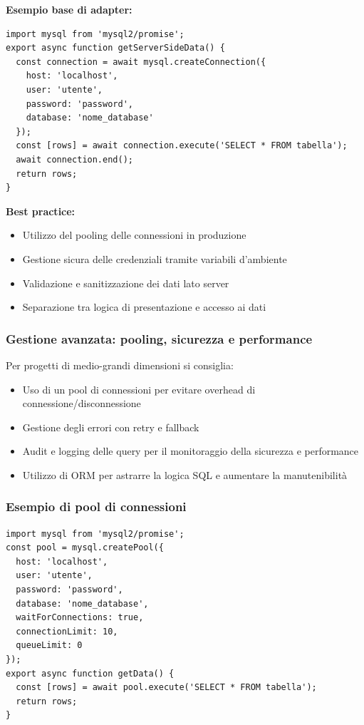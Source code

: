 \textbf{Esempio base di adapter:}
\begin{verbatim}
import mysql from 'mysql2/promise';
export async function getServerSideData() {
  const connection = await mysql.createConnection({
    host: 'localhost',
    user: 'utente',
    password: 'password',
    database: 'nome_database'
  });
  const [rows] = await connection.execute('SELECT * FROM tabella');
  await connection.end();
  return rows;
}
\end{verbatim}

\textbf{Best practice:} 
\begin{itemize}
    \item Utilizzo del pooling delle connessioni in produzione
    \item Gestione sicura delle credenziali tramite variabili d’ambiente
    \item Validazione e sanitizzazione dei dati lato server
    \item Separazione tra logica di presentazione e accesso ai dati
\end{itemize}

\subsubsection{Gestione avanzata: pooling, sicurezza e performance}
Per progetti di medio-grandi dimensioni si consiglia:
\begin{itemize}
    \item Uso di un pool di connessioni per evitare overhead di connessione/disconnessione
    \item Gestione degli errori con retry e fallback
    \item Audit e logging delle query per il monitoraggio della sicurezza e performance
    \item Utilizzo di ORM per astrarre la logica SQL e aumentare la manutenibilità
\end{itemize}

\subsubsection{Esempio di pool di connessioni}
\begin{verbatim}
import mysql from 'mysql2/promise';
const pool = mysql.createPool({
  host: 'localhost',
  user: 'utente',
  password: 'password',
  database: 'nome_database',
  waitForConnections: true,
  connectionLimit: 10,
  queueLimit: 0
});
export async function getData() {
  const [rows] = await pool.execute('SELECT * FROM tabella');
  return rows;
}
\end{verbatim}

